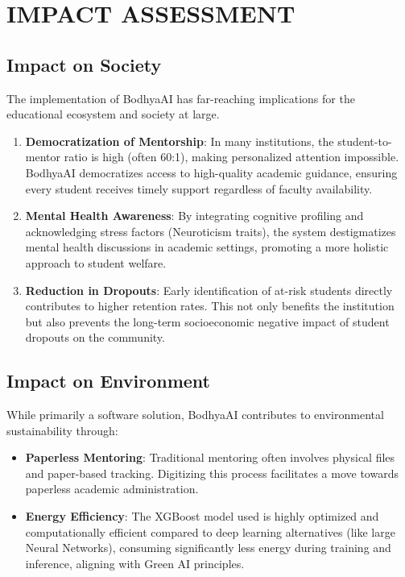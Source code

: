\documentclass[12pt,a4paper]{report}
\begin{document}
\chapter{IMPACT ASSESSMENT}

\section{Impact on Society}
The implementation of BodhyaAI has far-reaching implications for the educational ecosystem and society at large. 
\begin{enumerate}
    \item \textbf{Democratization of Mentorship}: In many institutions, the student-to-mentor ratio is high (often 60:1), making personalized attention impossible. BodhyaAI democratizes access to high-quality academic guidance, ensuring every student receives timely support regardless of faculty availability.
    \item \textbf{Mental Health Awareness}: By integrating cognitive profiling and acknowledging stress factors (Neuroticism traits), the system destigmatizes mental health discussions in academic settings, promoting a more holistic approach to student welfare.
    \item \textbf{Reduction in Dropouts}: Early identification of at-risk students directly contributes to higher retention rates. This not only benefits the institution but also prevents the long-term socioeconomic negative impact of student dropouts on the community.
\end{enumerate}

\section{Impact on Environment}
While primarily a software solution, BodhyaAI contributes to environmental sustainability through:
\begin{itemize}
    \item \textbf{Paperless Mentoring}: Traditional mentoring often involves physical files and paper-based tracking. Digitizing this process facilitates a move towards paperless academic administration.
    \item \textbf{Energy Efficiency}: The XGBoost model used is highly optimized and computationally efficient compared to deep learning alternatives (like large Neural Networks), consuming significantly less energy during training and inference, aligning with Green AI principles.
\end{itemize}
\end{document}
